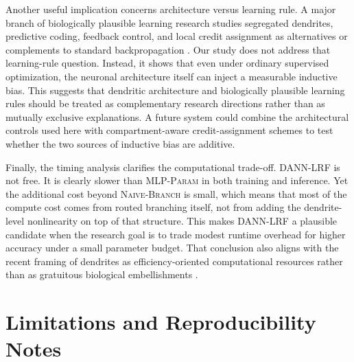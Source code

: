 \documentclass[preprint,12pt]{elsarticle}
\newcommand{\DANNLRF}{\textsc{DANN-LRF}}
\newcommand{\NAIVEBRANCH}{\textsc{Naive-Branch}}
\newcommand{\MLPPARAM}{\textsc{MLP-Param}}
\begin{document}
Another useful implication concerns architecture versus learning rule. A major branch of biologically plausible learning research studies segregated dendrites, predictive coding, feedback control, and local credit assignment as alternatives or complements to standard backpropagation \cite{guerguiev2017segregated,meulemans2021deepfeedback,tang2023predictive,millidge2024temporal,lv2025localized}. Our study does not address that learning-rule question. Instead, it shows that even under ordinary supervised optimization, the neuronal architecture itself can inject a measurable inductive bias. This suggests that dendritic architecture and biologically plausible learning rules should be treated as complementary research directions rather than as mutually exclusive explanations. A future system could combine the architectural controls used here with compartment-aware credit-assignment schemes to test whether the two sources of inductive bias are additive.

Finally, the timing analysis clarifies the computational trade-off. \DANNLRF{} is not free. It is clearly slower than \MLPPARAM{} in both training and inference. Yet the additional cost beyond \NAIVEBRANCH{} is small, which means that most of the compute cost comes from routed branching itself, not from adding the dendrite-level nonlinearity on top of that structure. This makes \DANNLRF{} a plausible candidate when the research goal is to trade modest runtime overhead for higher accuracy under a small parameter budget. That conclusion also aligns with the recent framing of dendrites as efficiency-oriented computational resources rather than as gratuitous biological embellishments \cite{makarov2023efficiency,pagkalos2024leveraging,chavlis2025parameter}.

\section{Limitations and Reproducibility Notes}
\label{sec:limitations}
\end{document}

